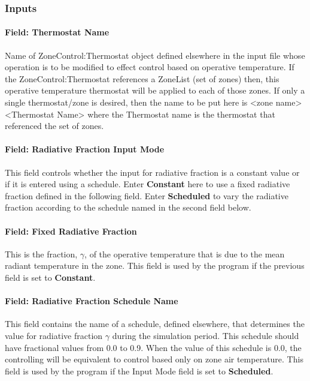 \subsubsection{Inputs}\label{inputs-5-034}

\paragraph{Field: Thermostat Name}\label{field-thermostat-name-000}

Name of ZoneControl:Thermostat object defined elsewhere in the input file whose operation is to be modified to effect control based on operative temperature. If the ZoneControl:Thermostat references a ZoneList (set of zones) then, this operative temperature thermostat will be applied to each of those zones. If only a single thermostat/zone is desired, then the name to be put here is \textless{}zone name\textgreater{} \textless{}Thermostat Name\textgreater{} where the Thermostat name is the thermostat that referenced the set of zones.

\paragraph{Field: Radiative Fraction Input Mode}\label{field-radiative-fraction-input-mode}

This field controls whether the input for radiative fraction is a constant value or if it is entered using a schedule. Enter \textbf{Constant} here to use a fixed radiative fraction defined in the following field. Enter \textbf{Scheduled} to vary the radiative fraction according to the schedule named in the second field below.

\paragraph{Field: Fixed Radiative Fraction}\label{field-fixed-radiative-fraction}

This is the fraction, \(\gamma\), of the operative temperature that is due to the mean radiant temperature in the zone. This field is used by the program if the previous field is set to \textbf{Constant}.

\paragraph{Field: Radiative Fraction Schedule Name}\label{field-radiative-fraction-schedule-name}

This field contains the name of a schedule, defined elsewhere, that determines the value for radiative fraction \(\gamma\) during the simulation period. This schedule should have fractional values from 0.0 to 0.9. When the value of this schedule is 0.0, the controlling will be equivalent to control based only on zone air temperature. This field is used by the program if the Input Mode field is set to \textbf{Scheduled}.


